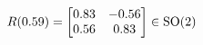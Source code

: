 \documentclass[preview]{standalone}
\begin{document}
\begin{align*}
\special{dvisvgm:raw <g id='unique000'>}R(0.59) = \begin{bmatrix} 0.83 & -0.56 \\ 0.56 & 0.83 \end{bmatrix} \in \text{SO}(2)\special{dvisvgm:raw </g>}
\end{align*}
\end{document}
